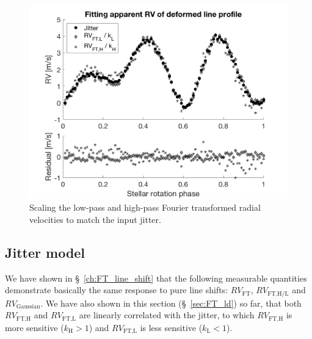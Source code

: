 \begin{figure}[tbp]
\centering
\includegraphics[width = 0.7 \linewidth]
{./Figures/Methods/5-JITTER_ONLY_4.png}
\caption[Scaling the low-pass and high-pass Fourier transformed radial velocities]
{Scaling the low-pass and high-pass Fourier transformed radial velocities to match the input jitter.}
\label{fig:scaling_RV_FT}
\end{figure} 

\subsection{Jitter model}
\label{subsec:Jitter_model}

We have shown in \S~\ref{ch:FT_line_shift} that the following measurable quantities demonstrate basically the same response to pure line shifts: $RV_\text{FT}$, $RV_\text{FT,H/L}$ and $RV_\text{Gaussian}$. We have also shown in this section (\S~\ref{sec:FT_ld}) so far, that both $RV_\text{FT,H}$ and $RV_\text{FT,L}$ are linearly correlated with the jitter, to which $RV_\text{FT,H}$ is more sensitive ($k_\text{H}>1$) and $RV_\text{FT,L}$ is less sensitive ($k_\text{L}<1$). 

